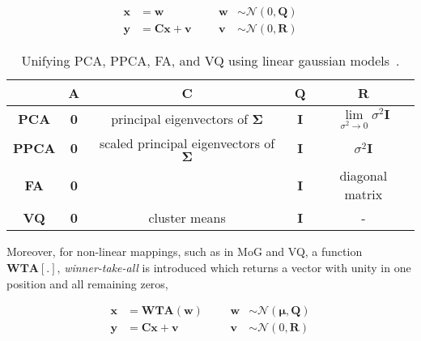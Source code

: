 \begin{equation}
\begin{array}{llllllllllllll}
\mathbf{x} &= \mathbf{w} 											& & & \mathbf{w} &\sim \mathcal{N}(0, \mathbf{Q})\\
\mathbf{y} &=  \mathbf{C}\mathbf{x} +  \mathbf{v} 		& & & \mathbf{v} & \sim \mathcal{N}(0, \mathbf{R})
\end{array}
\label{LGM1}
\end{equation}



\begin{table}[t]
\centering
\begin{tabular}{| c | c | c | c | c |}\hline
 				 	&\textbf{A}	 	&	\textbf{C}  									& \textbf{Q} 	&  \textbf{R}                                                                		\\\hline
\textbf{PCA} 	&\textbf{0}		&	principal eigenvectors of $\boldsymbol\Sigma$	& \textbf{I}  	&  $\lim\limits_{\sigma^2 \rightarrow 0} \sigma^2\mathbf{I}$ 	\\\hline
\textbf{PPCA} &\textbf{0}		& 	scaled principal eigenvectors of $\boldsymbol\Sigma$	& \textbf{I}	&										      $\sigma^2 \mathbf{I}$	 \\\hline
\textbf{FA}   	&\textbf{0}		&													& \textbf{I} 	&  diagonal matrix 																\\\hline
\textbf{VQ}	 	&\textbf{0} 	&	cluster means								& \textbf{I}	& 	-																					\\\hline
\end{tabular}
\caption{Unifying PCA, PPCA, FA, and VQ using linear gaussian models~\cite{1999_JNL_Gaussian_roweis, 1999_JNL_PPCA_Tipping}.}
\label{table:LGM_unifying}
\end{table}

Moreover, for non-linear mappings, such as in MoG and VQ, a function $\mathbf{WTA[.]}$, \emph{winner-take-all} is introduced which returns a vector with unity in one position and all remaining zeros,

\begin{equation}
\begin{array}{llllllllllllll}
\mathbf{x} &= \mathbf{WTA}(\mathbf{w}) 						& & & \mathbf{w} &\sim \mathcal{N}(\mathbf{\boldsymbol\mu}, \mathbf{Q})\\
\mathbf{y} &=  \mathbf{C}\mathbf{x} +  \mathbf{v} 		& & & \mathbf{v} & \sim \mathcal{N}(0, \mathbf{R})
\end{array}
\label{LGM2}
\end{equation}

